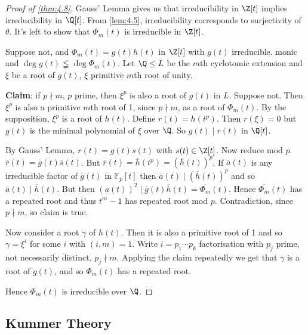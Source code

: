 \documentclass{article}
\newcommand{\F}{\mathbb{F}}
\begin{document}
\begin{proof}[Proof of \cref{thm:4.8}]
    Gauss' Lemma gives us that irreducibility in $\Z[t]$ implies irreducibility in $\Q[t]$.
    From \cref{lem:4.5}, irreducibility corresponds to surjectivity of $\theta$.
    It's left to show that $\Phi_m(t)$ is irreducible in $\Z[t]$.

    Suppose not, and $\Phi_m(t) = g(t) h(t)$ in $\Z[t]$ with $g(t)$ irreducible. monic and $\deg g(t) \lneqq \deg \Phi_m(t)$.
    Let $\Q \leq L$ be the $m$th cyclotomic extension and $\xi$ be a root of $g(t)$, $\xi$ primitive $m$th root of unity.

    \textbf{Claim}: if $p \nmid m$, $p$ prime, then $\xi^p$ is also a root of $g(t)$ in $L$.
    Suppose not. Then $\xi^p$ is also a primitive $m$th root of 1, since $p \nmid m$, as a root of $\Phi_m(t)$.
    By the supposition, $\xi^p$ is a root of $h(t)$.
    Define $r(t) = h(t^p)$. Then $r(\xi) = 0$ but $g(t)$ is the minimal polynomial of $\xi$ over $\Q$.
    So $g(t) \mid r(t)$ in $\Q[t]$.

    By Gauss' Lemma, $r(t) = g(t) s(t)$ with $s(t) \in \Z[t]$.
    Now reduce mod $p$. $\overline{r}(t) = \overline{g}(t) \overline{s}(t)$.
    But $\overline{r}(t) = \overline{h}(t^p) = (\overline{h}(t))^p$.
    If $\overline{a}(t)$ is any irreducible factor of $\overline{g}(t)$ in $\F_p[t]$ then $\overline{a}(t) \mid (\overline{h}(t))^p$ and so $\overline{a}(t) \mid \overline{h}(t)$.
    But then $(\overline{a}(t))^2 \mid \overline{g}(t) \overline{h}(t) = \overline{\Phi_m}(t)$.
    Hence $\overline{\Phi_m}(t)$ has a repeated root and thus $t^m-1$ has repeated root mod $p$.
    Contradiction, since $p \nmid m$, so claim is true.

    Now consider a root $\gamma$ of $h(t)$.
    Then it is also a primitive root of 1 and so $\gamma = \xi^i$ for some $i$ with $(i, m) = 1$.
    Write $i = p_1 \dotsm p_k$ factorisation with $p_j$ prime, not necessarily distinct, $p_j \nmid m$.
    Applying the claim repeatedly we get that $\gamma$ is a root of $g(t)$, and so $\Phi_m(t)$ has a repeated root.

    Hence $\Phi_m(t)$ is irreducible over $\Q$.
\end{proof}


\subsection{Kummer Theory}
\end{document}
